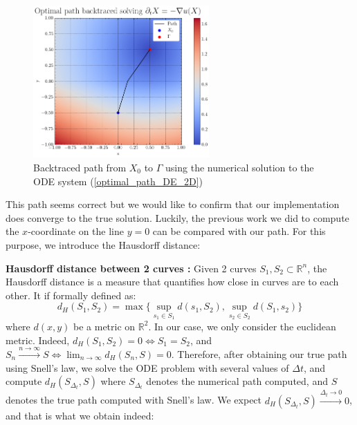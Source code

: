 \documentclass[11pt]{article}
\theoremstyle{definition}
\theoremstyle{remark}
\newcommand{\R}{\mathbb{R}}
\begin{document}
\begin{figure}[h]
  \centering
  \includegraphics[width=0.6\textwidth]{plots/snell_path.png}
  \caption{Backtraced path from $X_0$ to $\Gamma$ using the numerical solution to the ODE system (\ref{optimal_path_DE_2D})}
  \label{fig:snell_path}
\end{figure}

\noindent This path seems correct but we would like to confirm that our implementation does converge to the true solution. Luckily, the previous work we did to compute the $x$-coordinate on the line $y=0$ can be compared with our path. For this purpose, we introduce the Hausdorff distance: \\

\vspace{5pt}

\noindent\textbf{Hausdorff distance between 2 curves :} Given 2 curves $S_1,S_2\subset \mathbb{R}^n$, the Hausdorff distance is a measure that quantifies how close in curves are to each other. It if formally defined as:
\begin{equation*}
    d_H(S_1,S_2)=\max\{\sup_{s_1\in S_1}d(s_1,S_2),\sup_{s_2\in S_2}d(S_1,s_2)\}
\end{equation*}
where $d(x,y)$ be a metric on $\R^2$. In our case, we only consider the euclidean metric. Indeed, $d_H(S_1,S_2)=0\iff S_1=S_2$, and $S_n\xrightarrow{n\to\infty}S\iff\lim_{n\to\infty}d_H(S_n,S)=0$.
Therefore, after obtaining our true path using Snell's law, we solve the ODE problem with several values of $\Delta t$, and compute $d_H(S_{\Delta_t},S)$ where $S_{\Delta_t}$ denotes the numerical path computed, and $S$ denotes the true path computed with Snell's law. We expect $d_H(S_{\Delta_t},S)\xrightarrow{\Delta_t\to0}0$, and that is what we obtain indeed:
\end{document}
